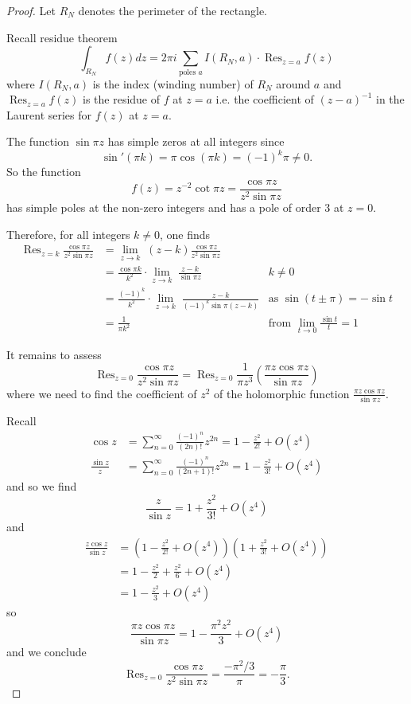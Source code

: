 \documentclass{article}
\DeclareMathOperator*{\Res}{Res}
\begin{document}
\begin{proof}
Let $R_N$ denotes the perimeter of the rectangle.

Recall residue theorem
$$\int_{R_N} f(z) dz = 2 \pi i \sum_{\text{poles } a} I(R_N, a) \cdot \Res_{z = a} f(z)$$
where $I(R_N, a)$ is the index (winding number) of $R_N$ around $a$ and $\Res_{z = a} f(z)$ is the residue of $f$ at $z = a$ i.e. the coefficient of $(z-a)^{-1}$ in the Laurent series for $f(z)$ at $z = a$. %

The function $\sin \pi z$ has simple zeros at all integers since
$$\sin'(\pi k) = \pi \cos(\pi k) = (-1)^k \pi \not= 0.$$
So the function
$$f(z) = z^{-2} \cot \pi z = \frac{\cos \pi z}{z^2 \sin \pi z}$$
has simple poles at the non-zero integers and has a pole of order 3 at $z = 0$.

Therefore, for all integers $k \not= 0$, one finds
\begin{align*}
\Res_{z = k} \frac{\cos \pi z}{z^2 \sin \pi z} &= \lim_{z \rightarrow k} \; (z - k) \frac{\cos \pi z}{z^2 \sin \pi z}\\
&= \frac{\cos \pi k}{k^2} \cdot \lim_{z \rightarrow k} \; \frac{z - k}{\sin \pi z} & k \not= 0\\
&= \frac{(-1)^k}{k^2} \cdot \lim_{z \rightarrow k} \; \frac{z - k}{(-1)^k \sin \pi (z - k)} & \text{as } \sin(t \pm \pi) = - \sin t\\
&= \frac{1}{\pi k^2} &\text{from } \lim_{t \rightarrow 0} \frac{\sin t}{t} = 1
\end{align*}

It remains to assess
$$\Res_{z = 0} \frac{\cos \pi z}{z^2 \sin \pi z} = \Res_{z = 0} \frac{1}{\pi z^3} \left(\frac{\pi z \cos \pi z}{\sin \pi z}\right)$$
where we need to find the coefficient of $z^2$ of the holomorphic function $\frac{\pi z \cos \pi z}{\sin \pi z}$.

Recall
\begin{align*}
\cos z &= \sum_{n = 0}^{\infty} \frac{(-1)^n}{(2n)!} z^{2n} = 1 - \frac{z^2}{2!} + O(z^4)\\
\frac{\sin z}{z} &= \sum_{n = 0}^{\infty} \frac{(-1)^n}{(2n + 1)!} z^{2n} = 1 - \frac{z^2}{3!} + O(z^4)
\end{align*}
and so we find
$$\frac{z}{\sin z} = 1 + \frac{z^2}{3!} + O(z^4)$$
and
\begin{align*}
\frac{z \cos z}{\sin z} &= \left( 1 - \frac{z^2}{2!} + O(z^4) \right) \left( 1 + \frac{z^2}{3!} + O(z^4) \right)\\
&= 1 - \frac{z^2}{2} + \frac{z^2}{6} + O(z^4)\\
&= 1 - \frac{z^2}{3} + O(z^4)
\end{align*}
so
$$\frac{\pi z \cos \pi z}{\sin \pi z} = 1 - \frac{\pi^2 z^2}{3} + O(z^4)$$
and we conclude
$$\Res_{z = 0} \frac{\cos \pi z}{z^2 \sin \pi z} = \frac{-\pi^2/3}{\pi} = - \frac{\pi}{3}.$$


\end{proof}
\end{document}
